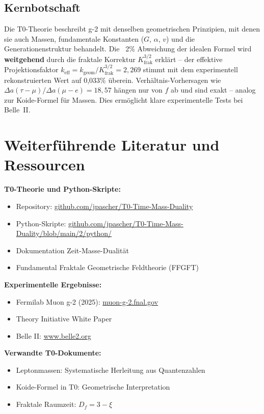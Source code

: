 	\subsection{Kernbotschaft}
	
	\begin{keypoint}
		Die T0-Theorie beschreibt g-2 mit denselben geometrischen Prinzipien, mit denen sie auch Massen, fundamentale Konstanten ($G$, $\alpha$, $v$) und die Generationenstruktur behandelt. Die ~2\% Abweichung der idealen Formel wird \textbf{weitgehend} durch die fraktale Korrektur $K_\text{frak}^{3/2}$ erklärt -- der effektive Projektionsfaktor $k_\text{eff} = k_\text{geom}/K_\text{frak}^{3/2} = 2{,}269$ stimmt mit dem experimentell rekonstruierten Wert auf 0{,}033\% überein. Verhältnis-Vorhersagen wie $\Delta a(\tau - \mu) / \Delta a(\mu - e) = 18{,}57$ hängen nur von $f$ ab und sind exakt -- analog zur Koide-Formel für Massen. Dies ermöglicht klare experimentelle Tests bei Belle~II.
	\end{keypoint}
	
	\section*{Weiterführende Literatur und Ressourcen}
	
	\textbf{T0-Theorie und Python-Skripte:}
	\begin{itemize}
		\item Repository: \href{https://github.com/jpascher/T0-Time-Mass-Duality}{github.com/jpascher/T0-Time-Mass-Duality}
		\item Python-Skripte: \href{https://github.com/jpascher/T0-Time-Mass-Duality/blob/main/2/python/}{github.com/jpascher/T0-Time-Mass-Duality/blob/main/2/python/}
		\item Dokumentation Zeit-Masse-Dualität
		\item Fundamental Fraktale Geometrische Feldtheorie (FFGFT)
	\end{itemize}
	
	\textbf{Experimentelle Ergebnisse:}
	\begin{itemize}
		\item Fermilab Muon g-2 (2025): \href{https://muon-g-2.fnal.gov/}{muon-g-2.fnal.gov}
		\item Theory Initiative White Paper
		\item Belle II: \href{https://www.belle2.org/}{www.belle2.org}
	\end{itemize}
	
	\textbf{Verwandte T0-Dokumente:}
	\begin{itemize}
		\item Leptonmassen: Systematische Herleitung aus Quantenzahlen
		\item Koide-Formel in T0: Geometrische Interpretation
		\item Fraktale Raumzeit: $D_f = 3 - \xi$
	\end{itemize}
	